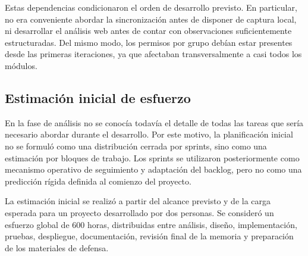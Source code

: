 Estas dependencias condicionaron el orden de desarrollo previsto. En particular, no era
conveniente abordar la sincronización antes de disponer de captura local, ni
desarrollar el análisis web antes de contar con observaciones suficientemente
estructuradas. Del mismo modo, los permisos por grupo debían estar presentes desde
las primeras iteraciones, ya que afectaban transversalmente a casi todos los
módulos.

\subsection{Estimación inicial de esfuerzo}

En la fase de análisis no se conocía todavía el detalle de todas las tareas que
sería necesario abordar durante el desarrollo. Por este motivo, la planificación
inicial no se formuló como una distribución cerrada por sprints, sino como una
estimación por bloques de trabajo. Los sprints se utilizaron posteriormente como
mecanismo operativo de seguimiento y adaptación del backlog, pero no como una
predicción rígida definida al comienzo del proyecto.

La estimación inicial se realizó a partir del alcance previsto y de la carga
esperada para un proyecto desarrollado por dos personas. Se consideró un esfuerzo
global de 600 horas, distribuidas entre análisis, diseño, implementación, pruebas,
despliegue, documentación, revisión final de la memoria y preparación de los
materiales de defensa.

